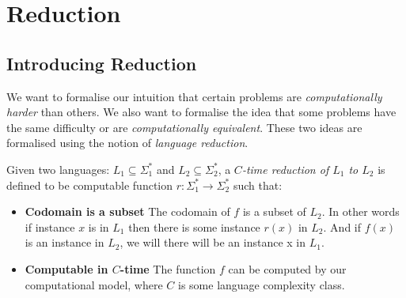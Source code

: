 
\chapter{Reduction}







\section{Introducing Reduction}


We want to formalise our intuition that certain problems are \textit{computationally harder} than
others. We also want to formalise the idea that some problems have the 
same difficulty or are \textit{computationally equivalent}. 
These two ideas are formalised using the notion of \textit{language reduction}.

Given two languages: $L_1 \subseteq \Sigma^{*}_1$
and $L_2 \subseteq \Sigma^{*}_2$, a \textit{$C$-time reduction of $L_1$ to $L_2$}
is defined to be computable function $r : \Sigma^{*}_1 \rightarrow \Sigma^{*}_2$
such that:

\begin{itemize}   
\renewcommand{\labelitemi}{$\Box$}
\item \textbf{Codomain is a subset} The codomain of $f$ is a subset of  $L_2$. 
In other words if instance $x$ is in $L_1$ then there is some instance $r(x)$ in $L_2$. 
And if $f(x)$ is an instance in $L_2$, we will there will be an instance x in $L_1$. 
\item \textbf{Computable in $C$-time} The function $f$ can be computed 
by our computational model, where $C$ 
is some language complexity class. 
\end{itemize} 




